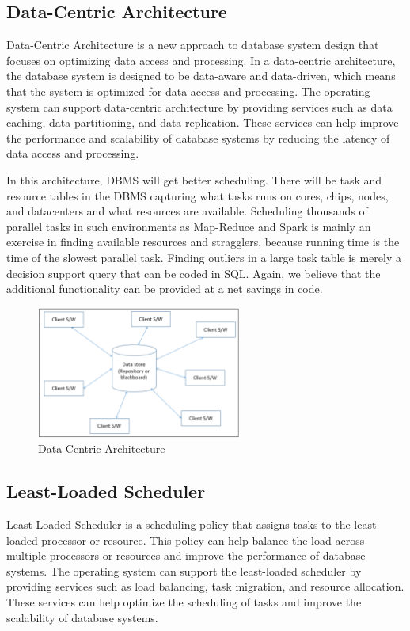 \documentclass[11pt,a4paper]{article}
\begin{document}
\subsection{Data-Centric Architecture}

Data-Centric Architecture is a new approach to database system design that focuses on optimizing data access and processing.
In a data-centric architecture, the database system is designed to be data-aware and data-driven, which means that the system is optimized for data access and processing.
The operating system can support data-centric architecture by providing services such as data caching, data partitioning, and data replication.
These services can help improve the performance and scalability of database systems by reducing the latency of data access and processing.

In this architecture, DBMS will get better scheduling. 
There will be task and resource tables in the DBMS capturing what tasks runs on cores, chips, nodes, and datacenters and what resources are available. 
Scheduling thousands of parallel tasks in such environments as Map-Reduce and Spark is 
mainly an exercise in finding available resources and stragglers, because running time is the time of the slowest parallel task. 
Finding outliers in a large task table is merely a decision support query that can be coded in SQL. 
Again, we believe that the additional functionality can be provided at a net savings in code.\cite{10.1007/978-3-030-71055-2_1}

\begin{figure}[h!]
    \centering
    \includegraphics[width=0.6\textwidth]{datacenarch.png}
    \caption{Data-Centric Architecture}
\end{figure}

\subsection{Least-Loaded Scheduler}

Least-Loaded Scheduler is a scheduling policy that assigns tasks to the least-loaded processor or resource.
This policy can help balance the load across multiple processors or resources and improve the performance of database systems.
The operating system can support the least-loaded scheduler by providing services such as load balancing, task migration, and resource allocation.
These services can help optimize the scheduling of tasks and improve the scalability of database systems.
\end{document}
